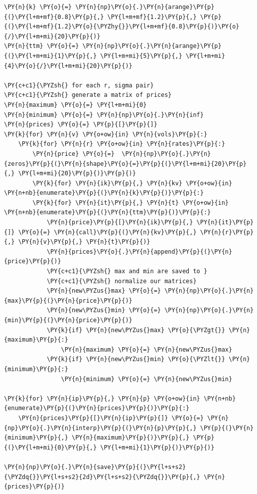 \begin{tcolorbox}[breakable, size=fbox, boxrule=1pt, pad at break*=1mm,colback=cellbackground, colframe=cellborder]
\begin{Verbatim}[commandchars=\\\{\}]
\PY{n}{k} \PY{o}{=} \PY{n}{np}\PY{o}{.}\PY{n}{arange}\PY{p}{(}\PY{l+m+mf}{0.8}\PY{p}{,} \PY{l+m+mf}{1.2}\PY{p}{,} \PY{p}{(}\PY{l+m+mf}{1.2}\PY{o}{\PYZhy{}}\PY{l+m+mf}{0.8}\PY{p}{)}\PY{o}{/}\PY{l+m+mi}{20}\PY{p}{)}
\PY{n}{ttm} \PY{o}{=} \PY{n}{np}\PY{o}{.}\PY{n}{arange}\PY{p}{(}\PY{l+m+mi}{1}\PY{p}{,} \PY{l+m+mi}{5}\PY{p}{,} \PY{l+m+mi}{4}\PY{o}{/}\PY{l+m+mi}{20}\PY{p}{)}
	
\PY{c+c1}{\PYZsh{} for each r, sigma pair}
\PY{c+c1}{\PYZsh{} generate a matrix of prices}
\PY{n}{maximum} \PY{o}{=} \PY{l+m+mi}{0}
\PY{n}{minimum} \PY{o}{=} \PY{n}{np}\PY{o}{.}\PY{n}{inf}
\PY{n}{prices} \PY{o}{=} \PY{p}{[}\PY{p}{]}
\PY{k}{for} \PY{n}{v} \PY{o+ow}{in} \PY{n}{vols}\PY{p}{:}
    \PY{k}{for} \PY{n}{r} \PY{o+ow}{in} \PY{n}{rates}\PY{p}{:}
        \PY{n}{price} \PY{o}{=}  \PY{n}{np}\PY{o}{.}\PY{n}{zeros}\PY{p}{(}\PY{n}{shape}\PY{o}{=}\PY{p}{(}\PY{l+m+mi}{20}\PY{p}{,} \PY{l+m+mi}{20}\PY{p}{)}\PY{p}{)}
        \PY{k}{for} \PY{n}{ik}\PY{p}{,} \PY{n}{kv} \PY{o+ow}{in} \PY{n+nb}{enumerate}\PY{p}{(}\PY{n}{k}\PY{p}{)}\PY{p}{:}
        \PY{k}{for} \PY{n}{it}\PY{p}{,} \PY{n}{t} \PY{o+ow}{in} \PY{n+nb}{enumerate}\PY{p}{(}\PY{n}{ttm}\PY{p}{)}\PY{p}{:}
            \PY{n}{price}\PY{p}{[}\PY{n}{ik}\PY{p}{,} \PY{n}{it}\PY{p}{]} \PY{o}{=} \PY{n}{call}\PY{p}{(}\PY{n}{kv}\PY{p}{,} \PY{n}{r}\PY{p}{,} \PY{n}{v}\PY{p}{,} \PY{n}{t}\PY{p}{)}
            \PY{n}{prices}\PY{o}{.}\PY{n}{append}\PY{p}{(}\PY{n}{price}\PY{p}{)}
            \PY{c+c1}{\PYZsh{} max and min are saved to }
            \PY{c+c1}{\PYZsh{} normalize our matrices}
            \PY{n}{new\PYZus{}max} \PY{o}{=} \PY{n}{np}\PY{o}{.}\PY{n}{max}\PY{p}{(}\PY{n}{price}\PY{p}{)}
            \PY{n}{new\PYZus{}min} \PY{o}{=} \PY{n}{np}\PY{o}{.}\PY{n}{min}\PY{p}{(}\PY{n}{price}\PY{p}{)}
            \PY{k}{if} \PY{n}{new\PYZus{}max} \PY{o}{\PYZgt{}} \PY{n}{maximum}\PY{p}{:}
                \PY{n}{maximum} \PY{o}{=} \PY{n}{new\PYZus{}max}
            \PY{k}{if} \PY{n}{new\PYZus{}min} \PY{o}{\PYZlt{}} \PY{n}{minimum}\PY{p}{:}
                \PY{n}{minimum} \PY{o}{=} \PY{n}{new\PYZus{}min}
	
\PY{k}{for} \PY{n}{ip}\PY{p}{,} \PY{n}{p} \PY{o+ow}{in} \PY{n+nb}{enumerate}\PY{p}{(}\PY{n}{prices}\PY{p}{)}\PY{p}{:}
    \PY{n}{prices}\PY{p}{[}\PY{n}{ip}\PY{p}{]} \PY{o}{=} \PY{n}{np}\PY{o}{.}\PY{n}{interp}\PY{p}{(}\PY{n}{p}\PY{p}{,} \PY{p}{(}\PY{n}{minimum}\PY{p}{,} \PY{n}{maximum}\PY{p}{)}\PY{p}{,} \PY{p}{(}\PY{l+m+mi}{0}\PY{p}{,} \PY{l+m+mi}{1}\PY{p}{)}\PY{p}{)}
	
\PY{n}{np}\PY{o}{.}\PY{n}{save}\PY{p}{(}\PY{l+s+s2}{\PYZdq{}}\PY{l+s+s2}{2d}\PY{l+s+s2}{\PYZdq{}}\PY{p}{,} \PY{n}{prices}\PY{p}{)}
\end{Verbatim}
\end{tcolorbox}

